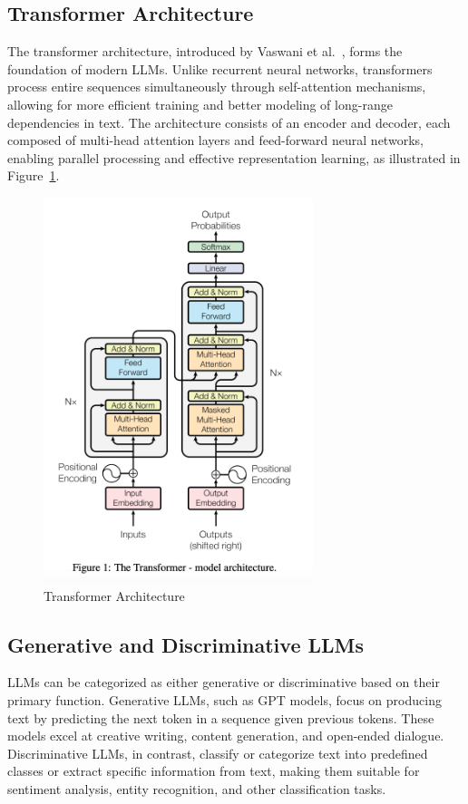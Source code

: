 \subsection{Transformer Architecture}
The transformer architecture, introduced by Vaswani et al.~\cite{vaswani2023attentionneed}, forms the 
foundation of modern LLMs. Unlike recurrent neural networks, transformers process entire sequences simultaneously 
through self-attention mechanisms, allowing for more efficient training and better modeling of long-range dependencies in text. 
The architecture consists of an encoder and decoder, each composed of multi-head attention layers and feed-forward neural networks, 
enabling parallel processing and effective representation learning, as illustrated in Figure~\ref{fig:transfromer_arch}.
\begin{figure}[htbp]
    \centering
    \includegraphics[width=0.7\textwidth]{figures/transformer_arch.png}
    \caption{Transformer Architecture}
    \label{fig:transfromer_arch}
\end{figure}
\subsection{Generative and Discriminative LLMs}
LLMs can be categorized as either generative or discriminative based on
their primary function. Generative LLMs, such as GPT models, focus on 
producing text by predicting the next token in a sequence given previous 
tokens. These models excel at creative writing, content generation, and
open-ended dialogue. Discriminative LLMs, in contrast, classify or 
categorize text into predefined classes or extract specific information 
from text, making them suitable for sentiment analysis, entity recognition,
and other classification tasks.
